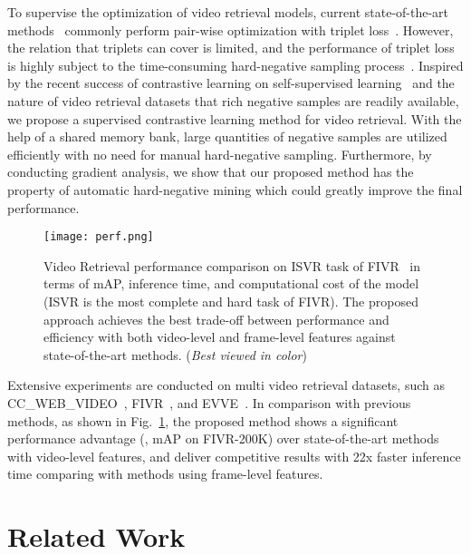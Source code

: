 \documentclass[10pt,twocolumn,letterpaper]{article}
\begin{document}
To supervise the optimization of video retrieval models, current state-of-the-art methods~\cite{kordopatis2017dml,kordopatis2019visil} commonly perform pair-wise optimization with triplet loss~\cite{weinberger2009distance}. However, the relation that triplets can cover is limited, and the performance of triplet loss is highly subject to the time-consuming hard-negative sampling process~\cite{sohn2016improved}.
Inspired by the recent success of contrastive learning on self-supervised learning~\cite{he2019momentum,chen2020simple} and the nature of video retrieval datasets that rich negative samples are readily available, we propose a supervised contrastive learning method for video retrieval. With the help of a shared memory bank, large quantities of negative samples are utilized efficiently with no need for manual hard-negative sampling.
Furthermore, by conducting gradient analysis, we show that our proposed method has the property of automatic hard-negative mining which could greatly improve the final performance.

\begin{figure}[t]
    \centering
    \texttt{[image: perf.png]}
    \caption{Video Retrieval performance comparison on ISVR task of FIVR~\cite{kordopatis2019fivr} in terms of mAP, inference time, and computational cost of the model (ISVR is the most complete and hard task of FIVR). The proposed approach achieves the best trade-off between performance and efficiency with both video-level and frame-level features against state-of-the-art methods. (\textit{Best viewed in color})}
    \label{fig:perf}
\end{figure}

Extensive experiments are conducted on multi video retrieval datasets, such as CC\_WEB\_VIDEO~\cite{wu2007practical}, FIVR~\cite{kordopatis2019fivr}, and EVVE~\cite{revaud2013event}.
In comparison with previous methods, as shown in Fig.~\ref{fig:perf}, the proposed method shows a significant performance advantage (\eg,  mAP on FIVR-200K) over state-of-the-art methods with video-level features, and deliver competitive results with 22x faster inference time comparing with methods using frame-level features.

\section{Related Work}
\end{document}
